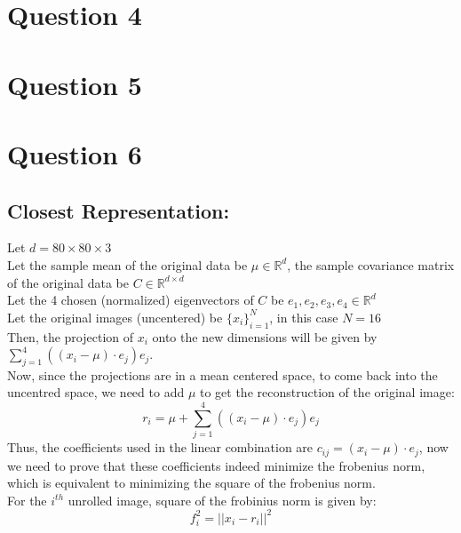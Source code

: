 \documentclass[11pt, fleqn]{article}
\begin{document}
\newpage
\section*{Question 4}
\setcounter{equation}{0}
\setcounter{figure}{0}

\newpage
\section*{Question 5}
\setcounter{equation}{0}
\setcounter{figure}{0}

\newpage
\section*{Question 6}
\setcounter{equation}{0}
\setcounter{figure}{0}
\subsection*{Closest Representation:}
Let $d = 80\times80\times3$\\
Let the sample mean of the original data be $\mu \in \mathbb{R}^d$, the sample covariance matrix of the original data be $C \in \mathbb{R}^{d\times d}$\\
Let the 4 chosen (normalized) eigenvectors of $C$ be $e_1, e_2, e_3, e_4 \in \mathbb{R}^d$\\ 
Let the original images (uncentered) be $\{x_i\}_{i=1}^N$, in this case $N = 16$\\
Then, the projection of $x_i$ onto the new dimensions will be given by $\sum_{j=1}^{4}((x_i - \mu)\cdot e_j)e_j$.\\
Now, since the projections are in a mean centered space, to come back into the uncentred space, we need to add $\mu$ to get the reconstruction of the original image:
$$
    \boxed{r_i = \mu + \sum_{j=1}^{4}((x_i - \mu)\cdot e_j)e_j}
$$
Thus, the coefficients used in the linear combination are $\boxed{c_{ij} = (x_i - \mu)\cdot e_j}$, now we need to prove that these coefficients indeed minimize the frobenius norm, which is equivalent to minimizing the square of the frobenius norm.\\

For the $i^{th}$ unrolled image, square of the frobinius norm is given by:
$$ 
    f_i^2 = ||x_i - r_i||^2 
$$
\end{document}
